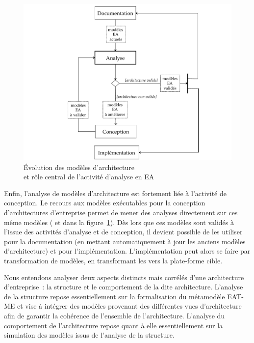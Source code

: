 \begin{figure}[!ht]
    \centering
    \includegraphics[width=1\textwidth]{figures/4_demarche/activite_ea.pdf}
    \caption{Évolution des modèles d'architecture \\
             et rôle central de l'activité d'analyse en EA}
    \label{fig:activite_ea}
\end{figure}

Enfin, l'analyse de modèles d'architecture est fortement liée à l'activité de conception. Le recours aux modèles
exécutables pour la conception d'architectures d'entreprise permet de mener des analyses directement sur ces
même modèles ( et  dans la figure~\ref{fig:activite_ea}). Dès lors que ces modèles sont validés à l'issue des activités d'analyse et de conception,
il devient possible de les utiliser pour la documentation (en mettant
automatiquement à jour les anciens modèles d'architecture) et pour l'implémentation. L'implémentation peut 
alors se faire par transformation de modèles, en transformant les  vers la plate-forme cible.

Nous entendons analyser deux aspects distincts mais corrélés d'une architecture
d'entreprise~: la structure et le comportement de la dite architecture.
L'analyse de la structure repose essentiellement sur la formalisation du métamodèle EAT-ME et vise à 
intégrer des modèles provenant des différentes vues d'architecture afin de garantir la cohérence
de l'ensemble de l'architecture. L'analyse du comportement de l'architecture repose quant à elle
essentiellement sur la simulation des modèles issus de l'analyse de la structure.

